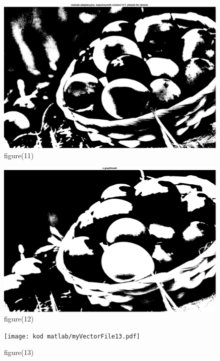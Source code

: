 \documentclass[10pt,a4paper,twoside]{article}%
\begin{document}
\begin{figure}[H]
    \centering
    \includegraphics[width=1\linewidth]{kod matlab/myVectorFile11.pdf}
\caption{figure(11)}
    \label{fig:obr1}
\end{figure}

\begin{figure}[H]
    \centering
    \includegraphics[width=1\linewidth]{kod matlab/myVectorFile12.pdf}
\caption{figure(12)}
    \label{fig:obr1}
\end{figure}

\begin{figure}[H]
    \centering
    \texttt{[image: kod matlab/myVectorFile13.pdf]}
\caption{figure(13)}
    \label{fig:obr1}
\end{figure}
\end{document}
